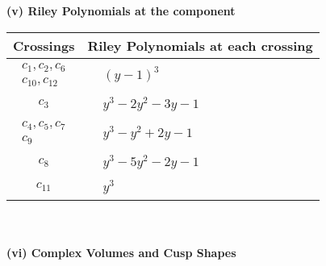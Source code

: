 \documentclass[1p]{elsarticle_modified}
\theoremstyle{definition}
\begin{document}
\newpage\renewcommand{\arraystretch}{1}
\flushleft \textbf{(v) Riley Polynomials at the component}\newline \\
\begin{tabular}{m{50pt}|m{274pt}}
Crossings & \hspace{64pt}Riley Polynomials at each crossing \\
\hline $$\begin{aligned}c_{1},c_{2},c_{6}\\c_{10},c_{12}\end{aligned}$$&$\begin{aligned}
&(y-1)^3
\end{aligned}$\\
\hline $$\begin{aligned}c_{3}\end{aligned}$$&$\begin{aligned}
&y^3-2 y^2-3 y-1
\end{aligned}$\\
\hline $$\begin{aligned}c_{4},c_{5},c_{7}\\c_{9}\end{aligned}$$&$\begin{aligned}
&y^3- y^2+2 y-1
\end{aligned}$\\
\hline $$\begin{aligned}c_{8}\end{aligned}$$&$\begin{aligned}
&y^3-5 y^2-2 y-1
\end{aligned}$\\
\hline $$\begin{aligned}c_{11}\end{aligned}$$&$\begin{aligned}
&y^3
\end{aligned}$\\
\hline
\end{tabular}\\~\\
\newpage\flushleft \textbf{(vi) Complex Volumes and Cusp Shapes}
\end{document}
